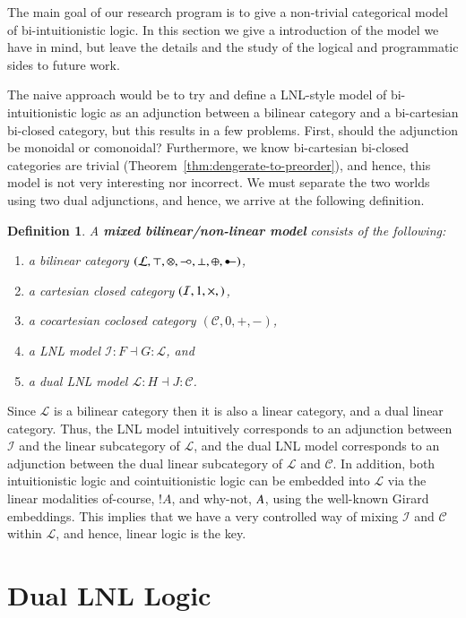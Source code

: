 \documentclass{lmcs}
\newtheorem{definition}[theorem]{Definition}
\let\to\relax
\newcommand{\to}{\rightarrow}
\let\wn\relax
\newcommand{\cat}[1]{\mathcal{#1}}
\newcommand{\limp}[0]{\multimap}
\newcommand{\colimp}[0]{\multimapdotinv}
\newcommand{\wn}[0]{\mathop{?}}
\def\limp{\mathrel{-\!\circ}}
\begin{document}
The main goal of our research program is to give a non-trivial
categorical model of bi-intuitionistic logic.  In this section we give
a introduction of the model we have in mind, but leave the details and
the study of the logical and programmatic sides to future work.

The naive approach would be to try and define a LNL-style model of
bi-intuitionistic logic as an adjunction between a bilinear category
and a bi-cartesian bi-closed category, but this results in a few
problems.  First, should the adjunction be monoidal or comonoidal?
Furthermore, we know bi-cartesian bi-closed categories are trivial
(Theorem~\ref{thm:dengerate-to-preorder}), and hence, this model is
not very interesting nor incorrect.  We must separate the two
worlds using two dual adjunctions, and hence, we arrive at the
following definition.
\begin{definition}
  \label{def:biLNL-model}
  A \textbf{mixed bilinear/non-linear model} consists of the
  following:
  \begin{enumerate}[label=\roman*.]
  \item a bilinear category $(\cat{L},
    \top,\otimes,\limp,\perp,\oplus,\colimp)$,
  \item a cartesian closed category $(\cat{I},1,\times,\to)$,
  \item a cocartesian coclosed category $(\cat{C},0,+,-)$, 
  \item a LNL model $\cat{I} : F \dashv G : \cat{L}$, and
  \item a dual LNL model $\cat{L} : H \dashv J : \cat{C}$.
  \end{enumerate}
\end{definition}
Since $\cat{L}$ is a bilinear category then it is also a linear
category, and a dual linear category.  Thus, the LNL model intuitively
corresponds to an adjunction between $\cat{I}$ and the linear
subcategory of $\cat{L}$, and the dual LNL model corresponds to an
adjunction between the dual linear subcategory of $\cat{L}$ and
$\cat{C}$.  In addition, both intuitionistic logic and
cointuitionistic logic can be embedded into $\cat{L}$ via the linear
modalities of-course, $!A$, and why-not, $\wn A$, using the well-known
Girard embeddings.  This implies that we have a very controlled way of
mixing $\cat{I}$ and $\cat{C}$ within $\cat{L}$, and hence, linear
logic is the key.

\section{Dual LNL Logic}
\label{sec:dual_lnl_logic}

\end{document}
